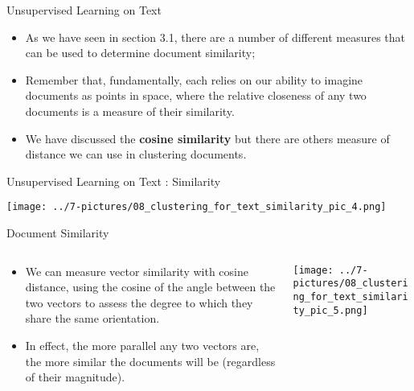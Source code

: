 \documentclass[11pt]{beamer}
\begin{document}
\begin{frame}{Unsupervised Learning on Text}
	\begin{itemize}
		\item As we have seen in section 3.1, there are a number of different measures that can be used to determine document similarity; 
		\item Remember that, fundamentally, each relies on our ability to imagine documents as points in space, where the relative closeness of any two documents is a measure of their similarity.
		\item We have discussed the \textbf{cosine similarity} but there are others measure of distance we can use in clustering documents. 
	\end{itemize}
\end{frame}
\begin{frame}{Unsupervised Learning on Text : Similarity}
	\begin{center}
	\texttt{[image: ../7-pictures/08\_clustering\_for\_text\_similarity\_pic\_4.png]}
	\end{center}
\end{frame}
\begin{frame}{Document Similarity}
\begin{columns}[T] %
\begin{column}{.48\textwidth}
        \begin{itemize}
		\item We can measure vector similarity with cosine distance, using the cosine of the angle between the two vectors to assess the degree to which they share the same orientation. 
		\item In effect, the more parallel any two vectors are, the more similar the documents will be (regardless of their magnitude).
        \end{itemize}
\end{column}%
\hfill%
\begin{column}{.48\textwidth}
        \texttt{[image: ../7-pictures/08\_clustering\_for\_text\_similarity\_pic\_5.png]}
\end{column}%
\end{columns}
\end{frame}
\end{document}
